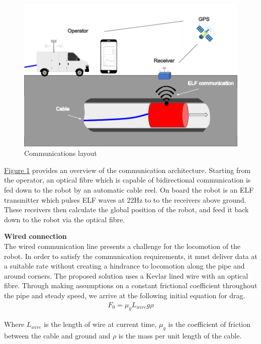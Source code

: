 \documentclass[11pt]{article}		%
\begin{document}
        \begin{figure}[h]
			\centering
			\includegraphics[scale=1]{comms layout.pdf}
			\caption{Communications layout}
			\label{commsLayout}
		\end{figure}
        
        \hyperref[commsLayout]{Figure \ref*{commsLayout}} provides an overview of the communication architecture. 
        Starting from the operator, an optical fibre which is capable of bidirectional communication is fed down to the robot by an automatic cable reel. 
        On board the robot is an ELF transmitter which pulses ELF waves at 22Hz to to the receivers above ground. 
        These receivers then calculate the global position of the robot, and feed it back down to the robot via the optical fibre.
       
        \textbf{Wired connection}
        \\
        The wired communication line presents a challenge for the locomotion of the robot. 
        In order to satisfy the communication requirements, it must deliver data at a suitable rate without creating a hindrance to locomotion along the pipe and around corners. 
        The proposed solution uses a Kevlar lined wire with an optical fibre. 
        Through making assumptions on a constant frictional coefficient throughout the pipe and steady speed, we arrive at the following initial equation for drag. 
        \begin{align}
				F_0 = \mu_g L_{wire}   g \rho
		\end{align}
        
        
        Where $L_{wire}$ is the length of wire at current time, $\mu_g$ is the coefficient of friction between the cable and ground and $\rho$ is the mass per unit length of the cable.
        
\end{document}
